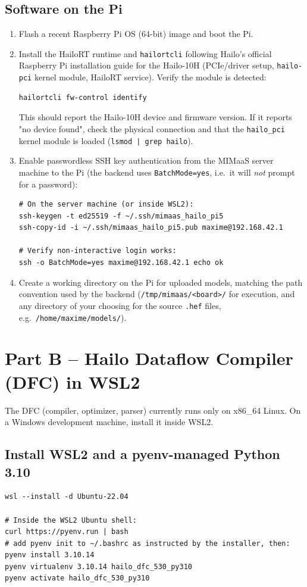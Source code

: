 \documentclass[11pt]{article}
\begin{document}
\subsection{Software on the Pi}
\begin{enumerate}
  \item Flash a recent Raspberry Pi OS (64-bit) image and boot the Pi.
  \item Install the HailoRT runtime and \texttt{hailortcli} following
    Hailo's official Raspberry Pi installation guide for the Hailo-10H
    (PCIe/driver setup, \texttt{hailo-pci} kernel module, HailoRT service).
    Verify the module is detected:
\begin{lstlisting}
hailortcli fw-control identify
\end{lstlisting}
  This should report the Hailo-10H device and firmware version. If it
  reports "no device found", check the physical connection and that the
  \texttt{hailo\_pci} kernel module is loaded (\texttt{lsmod | grep hailo}).
  \item Enable passwordless SSH key authentication from the MIMaaS server
    machine to the Pi (the backend uses \texttt{BatchMode=yes}, i.e.\ it
    will \emph{not} prompt for a password):
\begin{lstlisting}
# On the server machine (or inside WSL2):
ssh-keygen -t ed25519 -f ~/.ssh/mimaas_hailo_pi5
ssh-copy-id -i ~/.ssh/mimaas_hailo_pi5.pub maxime@192.168.42.1

# Verify non-interactive login works:
ssh -o BatchMode=yes maxime@192.168.42.1 echo ok
\end{lstlisting}
  \item Create a working directory on the Pi for uploaded models, matching
    the path convention used by the backend (\texttt{/tmp/mimaas/<board>/}
    for execution, and any directory of your choosing for the source
    \texttt{.hef} files, e.g.\ \texttt{/home/maxime/models/}).
\end{enumerate}

\section{Part B -- Hailo Dataflow Compiler (DFC) in WSL2}

The DFC (compiler, optimizer, parser) currently runs only on x86\_64 Linux.
On a Windows development machine, install it inside WSL2.

\subsection{Install WSL2 and a pyenv-managed Python 3.10}
\begin{lstlisting}
wsl --install -d Ubuntu-22.04

# Inside the WSL2 Ubuntu shell:
curl https://pyenv.run | bash
# add pyenv init to ~/.bashrc as instructed by the installer, then:
pyenv install 3.10.14
pyenv virtualenv 3.10.14 hailo_dfc_530_py310
pyenv activate hailo_dfc_530_py310
\end{lstlisting}
\end{document}
